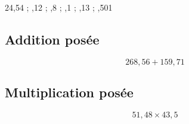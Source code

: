 24,54 \; ; ,12 \; ; ,8 \; ; ,1 \; ; ,13 \; ; ,501

\Pointilles[2]

\vspace{1cm}

\begin{multicols}{2} 

\subsection*{Addition posée}

$$268,56 + 159,71$$

\Pointilles[8]

\subsection*{Multiplication posée}

$$51,48 \times 43,5$$

\Pointilles[8]
\end{multicols}

